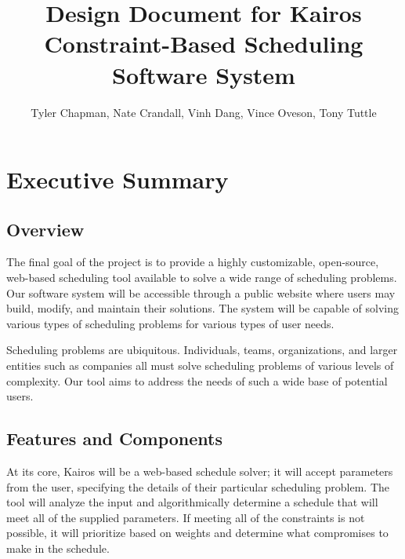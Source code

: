 \documentclass{extarticle}
\begin{document}
\begin{titlepage}
\title{Design Document for Kairos Constraint-Based Scheduling Software System}
\author{Tyler Chapman, Nate Crandall, Vinh Dang, Vince Oveson, Tony Tuttle}
\maketitle
\thispagestyle{empty}
\end{titlepage}

\tableofcontents

\newpage

\section{Executive Summary} %

\subsection{Overview}
The final goal of the project is to provide a highly customizable, open-source, web-based scheduling tool available
to solve a wide range of scheduling problems.  Our software system will be accessible through a public
website where users may build, modify, and maintain their solutions.  The system will be capable of solving various
types of scheduling problems for various types of user needs.

Scheduling problems are ubiquitous.  Individuals, teams, organizations, and larger entities such as companies all
must solve scheduling problems of various levels of complexity.  Our tool aims to address the needs of such a wide
base of potential users.

\subsection{Features and Components}
At its core, Kairos will be a web-based schedule solver; it will accept parameters from the user, specifying the
details of their particular scheduling problem.  The tool will analyze the input and algorithmically determine a
schedule that will meet all of the supplied parameters.  If meeting all of the constraints is not possible, it will
prioritize based on weights and determine what compromises to make in the schedule.
\end{document}
